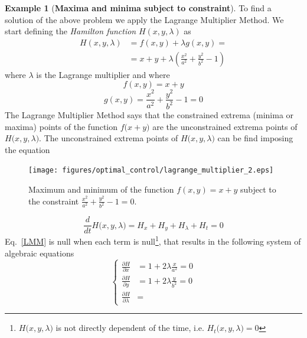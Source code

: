 \documentclass[11pt,a4paper,oneside]{book}
\numberwithin{equation}{section}
\theoremstyle{it}
\theoremstyle{definition}
\newtheorem{example}{Example}[chapter]
\begin{document}
\begin{example}[\textbf{Maxima and minima subject to constraint}]
	To find a solution of the above problem we apply the Lagrange Multiplier Method. We start defining the \textit{Hamilton function} $H(x,y,\lambda)$ as
	\begin{equation}
		\begin{aligned}
			H(x,y,\lambda)&=f(x,y)+\lambda g(x,y) = \\[6pt]
			&=x+y+\lambda\left( \frac{x^2}{a^2}+\frac{y^2}{b^2}-1 \right) 
		\end{aligned}
	\end{equation}
	where $\lambda$ is the Lagrange multiplier and where
	\begin{equation}
		f(x,y) = x+y
	\end{equation}
	\begin{equation}
		g(x,y) = \frac{x^2}{a^2}+\frac{y^2}{b^2}-1=0
	\end{equation}
	The Lagrange Multiplier Method says that the constrained extrema (minima or maxima) points of the function $f\big(x+y\big)$ are the unconstrained extrema points of $H\big(x,y,\lambda\big)$. The unconstrained extrema points of $H\big(x,y,\lambda\big)$ can be find imposing the equation
	\begin{figure}[H]
		\centering
		\texttt{[image: figures/optimal\_control/lagrange\_multiplier\_2.eps]}
		\captionsetup{width=0.75\textwidth}
		\caption{Maximum and minimum of the function $f(x,y) = x+y$ subject to the 
			constraint $\frac{x^2}{a^2}+\frac{y^2}{b^2}-1 = 0$.}
		\label{moltiplicatore1}
	\end{figure}
	\begin{equation}\label{LMM}
		\frac{d}{dt}H\big(x,y,\lambda\big)=H_x+H_y+H_\lambda+H_t=0
	\end{equation}
	Eq.~\eqref{LMM} is null when each term is null\footnote{$H\big(x,y,\lambda\big)$ is not directly dependent of the time, i.e. $H_t\big(x,y,\lambda\big)=0$}, that results in the following system of algebraic equations 
	\begin{equation}
		\left\lbrace \begin{aligned}
			\frac{\partial H}{\partial x} &= 1 + 2\lambda\frac{x}{a^2} = 0 \\[6pt]
			\frac{\partial H}{\partial y} &= 1 + 2\lambda\frac{y}{b^2} = 0 \\[6pt]
			\frac{\partial H}{\partial \lambda} &= 

\end{aligned}
\end{equation}
\end{example}
\end{document}
